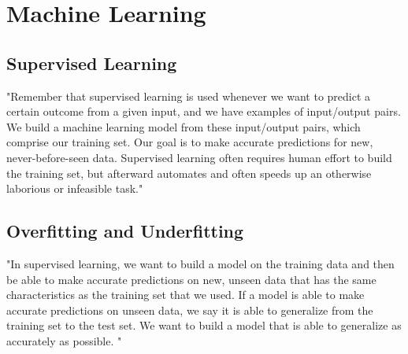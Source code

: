 
\section{Machine Learning}
\subsection{Supervised Learning}

"Remember that supervised learning is used whenever we want to predict a
certain outcome from a given input, and we have examples of input/output
pairs. We build a machine learning model from these input/output pairs,
which comprise our training set. Our goal is to make accurate
predictions for new, never-before-seen data. Supervised learning often
requires human effort to build the training set, but afterward
automates and often speeds up an otherwise laborious or infeasible task." \cite[p. 34]{muller_introductionmachinelearning_2016}

\subsection{Overfitting and Underfitting}
"In supervised learning, we want to build a model on the training data
and then be able to make accurate predictions on new, unseen data that
has the same characteristics as the training set that we used. If a
model is able to make accurate predictions on unseen data, we say it is
able to generalize from the training set to the test set. We want to
build a model that is able to generalize as accurately as possible. " \cite[p. 35]{muller_introductionmachinelearning_2016}

